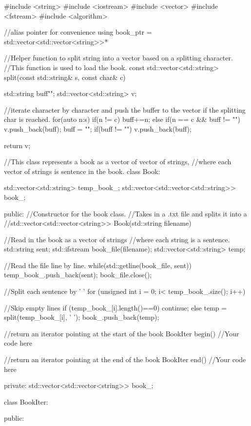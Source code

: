\documentclass[12pt,letterpaper,twoside]{article}
\begin{document}
\begin{cpp}
#include <string>
#include <iostream>
#include <vector>
#include <fstream>
#include <algorithm>


//alias pointer for convenience
using book_ptr = std::vector<std::vector<string>>*

//Helper function to split string into a vector based on a splitting character.
//This function is used to load the book.
const std::vector<std::string> split(const std::string& s, const char& c)
{
	std::string buff{""};
	std::vector<std::string> v;
	
	//iterate character by character and push the buffer to the vector if the splitting char is reached.
	for(auto n:s)
	{
		if(n != c) buff+=n; else
		if(n == c && buff != "") { v.push_back(buff); buff = ""; }
	}
	if(buff != "") v.push_back(buff);
	
	return v;
}

//This class represents a book as a vector of vector of strings,
//where each vector of strings is sentence in the book.
class Book:
{
	std::vector<std::string> temp_book_;
	std::vector<std::vector<std::string>> book_;
	
	public:
	//Constructor for the book class.
	//Takes in a .txt file and splits it into a
	//std::vector<std::vector<string>>
	Book(std::string filename) 
	{
		//Read in the book as a vector of strings
		//where each string is a sentence.
		std::string sent;
		std::ifstream book_file(filename);
		std::vector<std::string> temp;
		
		//Read the file line by line.
		while(std::getline(book_file, sent))
		{
			temp_book_.push_back(sent);
		}
		book_file.close();
		
		//Split each sentence by ' '
		for (unsigned int i = 0; i< temp_book_.size(); i++)
		{
			//Skip empty lines
			if (temp_book_[i].length()==0){
				continue;
			}
			else{
				temp = split(temp_book_[i], ' ');
				book_.push_back(temp);
			}
			
		}
		
	}
	
	
	//return an iterator pointing at the start of the book
	BookIter begin()
	{
		//Your code here
	} 
	
	//return an iterator pointing at the end of the book
	BookIter end()
	{
		//Your code here	
	}
	
	private:
	std::vector<std::vector<string>> book_;
	
}

class BookIter:
{
	public:
	
}
\end{cpp}
\end{document}
